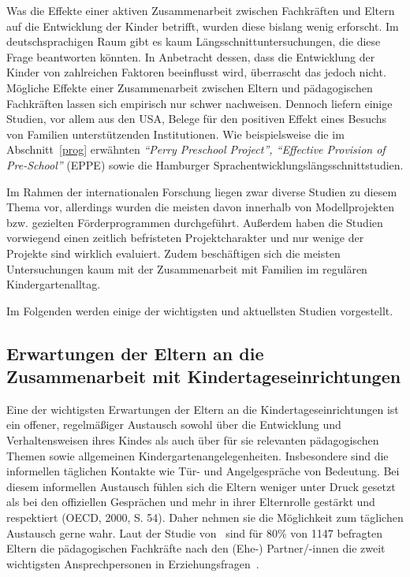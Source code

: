 \documentclass[12pt,a4paper]{article}
\begin{document}
	Was die Effekte einer aktiven Zusammenarbeit zwischen Fachkräften und Eltern auf die Entwicklung der Kinder betrifft, wurden diese bislang wenig erforscht. Im deutschsprachigen Raum gibt es kaum Längsschnittuntersuchungen, die diese Frage beantworten könnten. In Anbetracht dessen, dass die Entwicklung der Kinder von zahlreichen Faktoren beeinflusst wird, überrascht das jedoch nicht. Mögliche Effekte einer Zusammenarbeit zwischen Eltern und pädagogischen Fachkräften lassen sich empirisch nur schwer nachweisen. Dennoch liefern einige Studien, vor allem aus den USA, Belege für den positiven Effekt eines Besuchs von Familien unterstützenden Institutionen. Wie beispielsweise die im Abschnitt~\ref{prog} erwähnten \textit{"`Perry Preschool Project"', "`Effective Provision of Pre-School"'} (EPPE) sowie die Hamburger Sprachentwicklungslängsschnittstudien.
	
Im Rahmen der internationalen Forschung liegen zwar diverse Studien zu diesem Thema vor, allerdings wurden die meisten davon innerhalb von Modellprojekten bzw. gezielten Förderprogrammen durchgeführt. Außerdem haben die Studien vorwiegend einen zeitlich befristeten Projektcharakter und nur wenige der Projekte sind wirklich evaluiert. Zudem beschäftigen sich die meisten Untersuchungen kaum mit der Zusammenarbeit mit Familien im regulären Kindergartenalltag.

Im Folgenden werden einige der wichtigsten und aktuellsten Studien vorgestellt.

\subsection{Erwartungen der Eltern an die Zusammenarbeit mit Kindertageseinrichtungen} 
Eine der wichtigsten Erwartungen der Eltern an die Kindertageseinrichtungen ist ein offener, regelmäßiger Austausch sowohl über die Entwicklung und Verhaltensweisen ihres Kindes als auch über für sie relevanten pädagogischen Themen sowie allgemeinen Kindergartenangelegenheiten. Insbesondere sind die informellen täglichen Kontakte wie Tür- und Angelgespräche von Bedeutung. Bei diesem informellen Austausch fühlen sich die Eltern weniger unter Druck gesetzt als bei den offiziellen Gesprächen und mehr in ihrer Elternrolle gestärkt und respektiert (OECD, 2000, S. 54). Daher nehmen sie die Möglichkeit zum täglichen Austausch gerne wahr. Laut der Studie von~\textcite{Froelich} sind für 80\% von 1147 befragten Eltern die pädagogischen Fachkräfte nach den (Ehe-) Partner/-innen die zweit wichtigsten Ansprechpersonen in Erziehungsfragen~\parencite[S.~10]{Froelich}.
	
\end{document}
